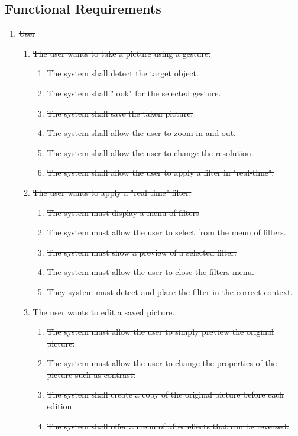 \documentclass[12pt, titlepage]{article}
\begin{document}
\subsection{Functional Requirements}
\begin{enumerate}[{VP}1.]
	\item \sout{User} 
	\begin{enumerate}[{BE1}.1]
	    \item \sout{The user wants to take a picture using a gesture.}
	    \begin{enumerate}
	        \item \sout{The system shall detect the target object. }
	        \item \sout{The system shall "look" for the selected gesture.}
	        \item \sout{The system shall save the taken picture. }
	        \item \sout{The system shall allow the user to zoom in and out. }
	        \item \sout{The system shall allow the user to change the resolution.}
	        \item \sout{The system shall allow the user to apply a filter in "real-time".}
	    \end{enumerate}
	    
	    \item \sout{The user wants to apply a "real time" filter.}
	    \begin{enumerate}
	        \item \sout{The system must display a menu of filters}
	        \item \sout{The system must allow the user to select from the menu of filters.}
	        \item \sout{The system must show a preview of a selected filter.}
	        \item \sout{The system must allow the user to close the filters menu.}
	        \item \sout{They system must detect and place the filter in the correct context. }
	    \end{enumerate}
	    
	    \item \sout{The user wants to edit a saved picture.}
	    \begin{enumerate}
            \item \sout{The system must allow the user to simply preview the original picture.}
            \item \sout{The system must allow the user to change the properties of the picture such as contrast.}
            \item \sout{The system shall create a copy of the original picture before each edition.}
            \item \sout{The system shall offer a menu of after effects that can be reversed. }
	    \end{enumerate}
	\end{enumerate} 
\end{enumerate} 
\end{document}
